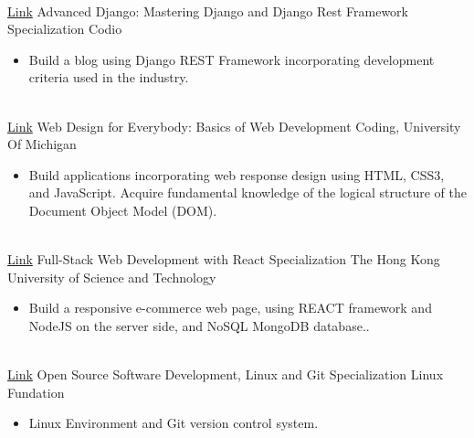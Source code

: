\documentclass[letterpaper]{DS_class_file} %
\begin{document}
\begin{twenty}
{{\begin{itemize}
		\end{itemize}}
	}
	\\
	\twentyitem
	{\href{https://github.com/maaferna/codio_blango}{Link}}
	{}
	{\hspace{0.1cm}Advanced Django: Mastering Django and Django Rest Framework Specialization}
	{Codio}
	{}
	{
		{\begin{itemize}
				\item Build a blog using Django REST Framework incorporating development criteria used in the industry.
		\end{itemize}}
	}
	\\
	\twentyitem
	{\href{https://www.coursera.org/specializations/web-design}{Link}}
	{}
	{\hspace{0.1cm}Web Design for Everybody: Basics of Web Development  Coding,}
	{University Of Michigan}
	{}
	{
		{\begin{itemize}
				\item Build applications incorporating web response design using HTML, CSS3, and JavaScript. Acquire fundamental knowledge of the logical structure of the Document Object Model (DOM).
		\end{itemize}}
	}
	\\
	\twentyitem
	{\href{https://github.com/maaferna/react_project}{Link}}
	{}
	{\hspace{0.1cm}Full-Stack Web Development with React Specialization}
	{The Hong Kong University of Science and Technology}
	{}
	{
		{\begin{itemize}
				\item Build a responsive e-commerce web page, using REACT framework and NodeJS on the server side, and NoSQL MongoDB database..
		\end{itemize}}
	}
	\\
	\twentyitem
	{\href{https://www.coursera.org/specializations/oss-development-linux-git}{Link}}
	{}
	{\hspace{0.1cm}Open Source Software Development, Linux and Git Specialization}
	{Linux Fundation}
	{}
	{
		{\begin{itemize}
				\item Linux Environment and Git version control system.
		\end{itemize}}
	}
\end{twenty}



\newpage

\makeseconda %
\end{document}
